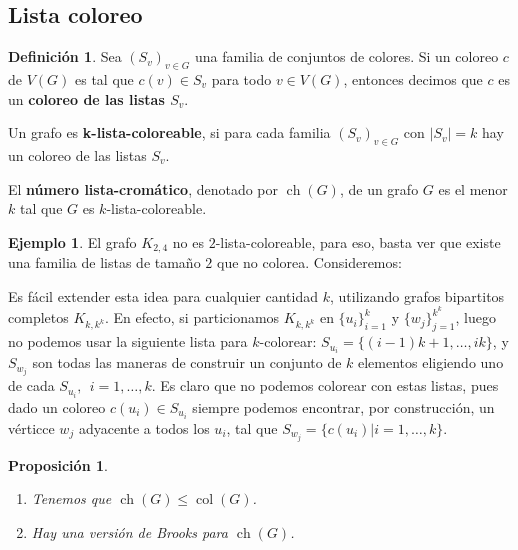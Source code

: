 \documentclass[12pt]{report}
\theoremstyle{plain}
\newtheorem{proposition}[theorem]{Proposición}
\theoremstyle{definition}
\newtheorem{definition}[theorem]{Definición}
\newtheorem{example}[theorem]{Ejemplo}
\newcommand{\abs}[1]{\left \vert #1 \right \vert}
\newcommand{\col}[1]{\operatorname{col} (#1)}
\newcommand{\ch}[1]{\operatorname{ch} (#1)}
\begin{document}


\subsection{Lista coloreo}

\begin{definition}
Sea $(S_v)_{v \in G}$ una familia de conjuntos de colores. Si un coloreo $c$ de $V(G)$ es tal que $c(v) \in S_v$ para todo $v \in V(G)$, entonces decimos que $c$ es un \textbf{coloreo de las listas $S_v$}.

Un grafo es \textbf{k-lista-coloreable}, si para cada familia $(S_v)_{v \in G}$ con $\abs {S_v} = k$ hay un coloreo de las listas $S_v$.

El \textbf{número lista-cromático}, denotado por $\ch G$, de un grafo $G$ es el menor $k$ tal que $G$ es $k$-lista-coloreable.
\end{definition}

\begin{example}
El grafo $K_{2,4}$ no es $2$-lista-coloreable, para eso, basta ver que existe una familia de listas de tamaño $2$ que no colorea. Consideremos:


Es fácil extender esta idea para cualquier cantidad $k$, utilizando grafos bipartitos completos $K_{k, k^k}$. En efecto, si particionamos $K_{k,k^k}$ en $\{u_i\}_{i = 1}^k$ y $\{w_j\}_{j = 1}^{k^k}$, luego no podemos usar la siguiente lista para $k$-colorear: $S_{u_i} = \{(i-1)k + 1, \ldots, ik\}$, y $S_{w_j}$ son todas las maneras de construir un conjunto de $k$ elementos eligiendo uno de cada $S_{u_i}, \: \: i = 1 , \ldots, k$. Es claro que no podemos colorear con estas listas, pues dado un coloreo $c(u_i) \in S_{u_i}$ siempre podemos encontrar, por construcción, un vérticce $w_j$ adyacente a todos los $u_i$, tal que $S_{w_j} = \{ c(u_i) | i = 1, \ldots, k\}$.
\end{example}


\begin{proposition}
\begin{enumerate}
\item Tenemos que $\ch G \leq \col G$.
\item Hay una versión de Brooks para $\ch G$.
\end{enumerate}
\end{proposition}
\end{document}
